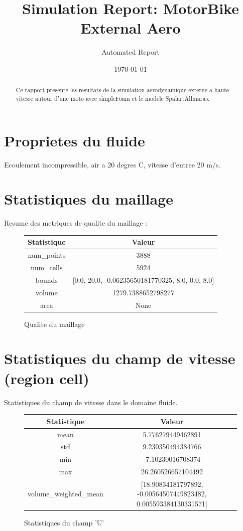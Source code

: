 \documentclass{article}%
\title{Simulation Report: MotorBike External Aero}%
\author{Automated Report}%
\date{\today}%
\begin{document}
%
\normalsize%
\maketitle%
\tableofcontents%
\begin{abstract}%
Ce rapport presente les resultats de la simulation aerodynamique externe a haute vitesse autour d'une moto avec simpleFoam et le modele SpalartAllmaras.%
\end{abstract}%
\section{Proprietes du fluide}%
\label{sec:Proprietesdufluide}%
Ecoulement incompressible, air a 20 degres C, vitesse d'entree 20 m/s.

%
\section{Statistiques du maillage}%
\label{sec:Statistiquesdumaillage}%
Resume des metriques de qualite du maillage :

%


\begin{figure}[h!]%
\begin{tabular}{|c|c|}%
\hline%
Statistique&Valeur\\%
\hline%
num\_points&3888\\%
\hline%
num\_cells&5924\\%
\hline%
bounds&{[}0.0, 20.0, {-}0.06235650181770325, 8.0, 0.0, 8.0{]}\\%
\hline%
volume&1279.7388652798277\\%
\hline%
area&None\\%
\hline%
\end{tabular}%
\caption{Qualite du maillage}%
\end{figure}

%
\section{Statistiques du champ de vitesse (region cell)}%
\label{sec:Statistiquesduchampdevitesse(regioncell)}%
Statistiques du champ de vitesse dans le domaine fluide.

%


\begin{figure}[h!]%
\begin{tabular}{|c|c|}%
\hline%
Statistique&Valeur\\%
\hline%
mean&5.776279449462891\\%
\hline%
std&9.230350494384766\\%
\hline%
min&{-}7.10230016708374\\%
\hline%
max&26.260526657104492\\%
\hline%
volume\_weighted\_mean&{[}18.90834181797892, {-}0.00564507449823482, 0.005593384130331571{]}\\%
\hline%
\end{tabular}%
\caption{Statistiques du champ 'U'}%
\end{figure}
\end{document}
